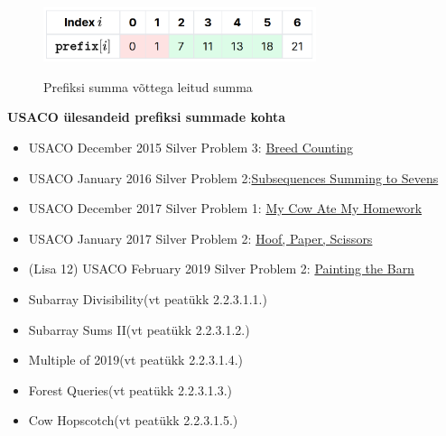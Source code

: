 \documentclass{trkut}
\theoremstyle{definition}
\begin{document}
\begin{appendices}
\begin{figure}[H]%
    \includegraphics[width=8cm]{PrefiksMassiiv2.png}%
    \caption{Prefiksi summa võttega leitud summa}%
    \label{EMaxx}%
\end{figure}


\textbf{USACO ülesandeid prefiksi summade kohta}

\begin{itemize}
    \item USACO December 2015 Silver Problem 3: \href{http://usaco.org/index.php?page=viewproblem2&cpid=572}{Breed Counting} 
    \item USACO January 2016 Silver Problem 2:\href{http://usaco.org/index.php?page=viewproblem2&cpid=595}{Subsequences Summing to Sevens} 
    \item USACO December 2017 Silver Problem 1: \href{http://www.usaco.org/index.php?page=viewproblem2&cpid=762}{My Cow Ate My Homework} 
    \item USACO January 2017 Silver Problem 2: \href{http://www.usaco.org/index.php?page=viewproblem2&cpid=691}{Hoof, Paper, Scissors} 
    \item (Lisa 12) USACO February 2019 Silver Problem 2: \href{http://www.usaco.org/index.php?page=viewproblem2&cpid=919}{Painting the Barn} 
    \item Subarray Divisibility(vt peatükk 2.2.3.1.1.)
    \item Subarray Sums II(vt peatükk 2.2.3.1.2.)
    \item Multiple of 2019(vt peatükk 2.2.3.1.4.)
    \item Forest Queries(vt peatükk 2.2.3.1.3.)
    \item Cow Hopscotch(vt peatükk 2.2.3.1.5.)
\end{itemize}



\end{appendices}
\end{document}
